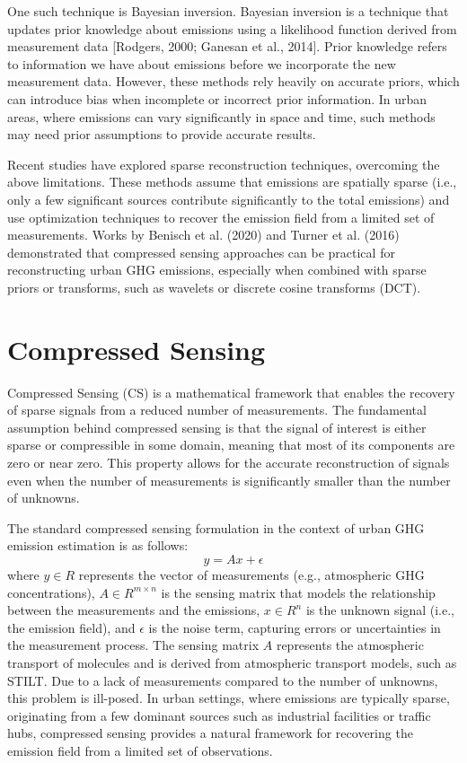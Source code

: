 One such technique is Bayesian inversion.
Bayesian inversion is a technique that updates prior knowledge about emissions using a likelihood function derived from measurement data [Rodgers, 2000; Ganesan et al., 2014].
Prior knowledge refers to information we have about emissions before we incorporate the new measurement data.
However, these methods rely heavily on accurate priors, which can introduce bias when incomplete or incorrect prior information.
In urban areas, where emissions can vary significantly in space and time, such methods may need prior assumptions to provide accurate results.

Recent studies have explored sparse reconstruction techniques, overcoming the above limitations.
These methods assume that emissions are spatially sparse (i.e., only a few significant sources contribute significantly to the total emissions) and use optimization techniques to recover the emission field from a limited set of measurements.
Works by Benisch et al. (2020) and Turner et al. (2016) demonstrated that compressed sensing approaches can be practical for reconstructing urban GHG emissions, especially when combined with sparse priors or transforms, such as wavelets or discrete cosine transforms (DCT).

\section{Compressed Sensing}
Compressed Sensing (CS) is a mathematical framework that enables the recovery of sparse signals from a reduced number of measurements.
The fundamental assumption behind compressed sensing is that the signal of interest is either sparse or compressible in some domain, meaning that most of its components are zero or near zero.
This property allows for the accurate reconstruction of signals even when the number of measurements is significantly smaller than the number of unknowns.

The standard compressed sensing formulation in the context of urban GHG emission estimation is as follows:
\begin{equation}
    y = A x + \epsilon
\end{equation}
where $y \in R$ represents the vector of measurements (e.g., atmospheric GHG concentrations), $A \in R^{m \times n}$ is the sensing matrix that models the relationship between the measurements and the emissions, $x \in R^n$ is the unknown signal (i.e., the emission field), and $\epsilon$ is the noise term, capturing errors or uncertainties in the measurement process.
The sensing matrix $A$ represents the atmospheric transport of molecules and is derived from atmospheric transport models, such as STILT.
Due to a lack of measurements compared to the number of unknowns, this problem is ill-posed.
In urban settings, where emissions are typically sparse, originating from a few dominant sources such as industrial facilities or traffic hubs, compressed sensing provides a natural framework for recovering the emission field from a limited set of observations.

